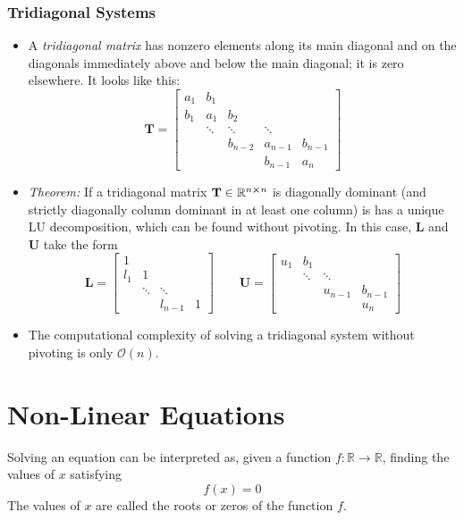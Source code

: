 \documentclass[11pt, a4paper]{article}
\newcommand{\R}{\mathbb{R}} %
\newcommand{\mat}[1]{\mathbf{#1}} %
\begin{document}
\subsubsection{Tridiagonal Systems}
\begin{itemize}
	\item A \textit{tridiagonal matrix} has nonzero elements along its main diagonal and on the diagonals immediately above and below the main diagonal; it is zero elsewhere. It looks like this:
	\[
		\mat{T} = \begin{bmatrix}
			a_1 & b_1 &  &  &\\
			b_{1} & a_1 & b_2 &  &\\
			& \ddots & \ddots & \ddots &\\
			& & b_{n-2} & a_{n-1} & b_{n-1}\\
			& & & b_{n-1} & a_{n}
		\end{bmatrix}
	\]
	
	\item \textit{Theorem:} If a tridiagonal matrix $ \mat{T} \in \R^{n\cross n} $ is diagonally dominant (and strictly diagonally column dominant in at least one column) is has a unique LU decomposition, which can be found without pivoting. In this case, $ \mat{L} $ and $ \mat{U} $ take the form
	\[
		\mat{L} = 
		\begin{bmatrix}
			1 &  &  &\\
			l_{1} & 1&  &\\
			& \ddots & \ddots &\\
			& & l_{n-1} & 1
		\end{bmatrix}		
		\qquad \mat{U} = 
		\begin{bmatrix}
			u_{1} & b_{1} &  &\\
			& \ddots & \ddots & \\
			& & u_{n-1} & b_{n-1}\\
			& & & u_{n}
		\end{bmatrix}		
	\]
	
	\item The computational complexity of solving a tridiagonal system without pivoting is only $ \mathcal{O}(n) $.
		
\end{itemize}

\newpage

\section{Non-Linear Equations}

Solving an equation can be interpreted as, given a function $ f : \R \to \R $, finding the values of $ x $ satisfying
\begin{equation*}
	f(x) = 0
\end{equation*}
The values of $ x $ are called the roots or zeros of the function $ f $. 
\end{document}
